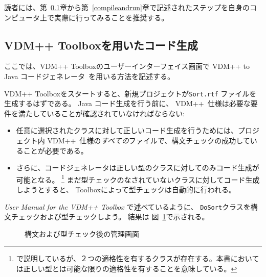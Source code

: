 \documentclass[\pformat,11pt]{jarticle}
\newcommand{\ToolboxName}{VDM++ Toolbox}
\newcommand{\Toolbox}{Toolbox}
\newcommand{\langmancite}{\cite{LangManPP-CSK}}
\newcommand{\VDM}{VDM++}
\newcommand{\cg}{VDM++ to Java コードジェネレータ}
\begin{document}
読者には、第~\ref{gui}章から第~\ref{compileandrun}章で記述されたステップを自身のコンピュータ上で実際に行ってみることを推奨する。

\subsection{VDM++ Toolboxを用いたコード生成}
\label{gui}

ここでは、\ToolboxName{}のユーザーインターフェイス画面で \cg\ を用いる方法を記述する。

 \ToolboxName{}をスタートすると、新規プロジェクトが{\tt Sort.rtf} ファイルを生成するはずである。
Java コード生成を行う前に、 \VDM\ 仕様は必要な要件を満たしていることが確認されていなければならない:

\begin{itemize}
\item
任意に選択されたクラスに対して正しいコード生成を行うためには、プロジェクト内 \VDM\ 仕様の{\em すべての}ファイルで、構文チェックの成功していることが必要である。

\item
さらに、コードジェネレータは正しい型のクラスに対してのみコード生成が可能となる。
\footnote{\langmancite で説明しているが、２つの適格性を有するクラスが存在する。本書においては正しい型とは可能な限りの適格性を有することを意味している。}
まだ型チェックのなされていないクラスに対してコード生成しようとすると、 \Toolbox{}によって型チェックは自動的に行われる。
\end{itemize}

{\em User Manual for the \VDM{} Toolbox} \cite{UserManPP-CSK}で述べているように、 {\tt DoSort}クラスを構文チェックおよび型チェックしよう。
結果は 図~\ref{fig:toolbox}で示される。

\begin{figure}[H]
\begin{center}
\mbox{}
\caption{構文および型チェック後の管理画面}\label{fig:toolbox}
\end{center}
\end{figure}
\end{document}
